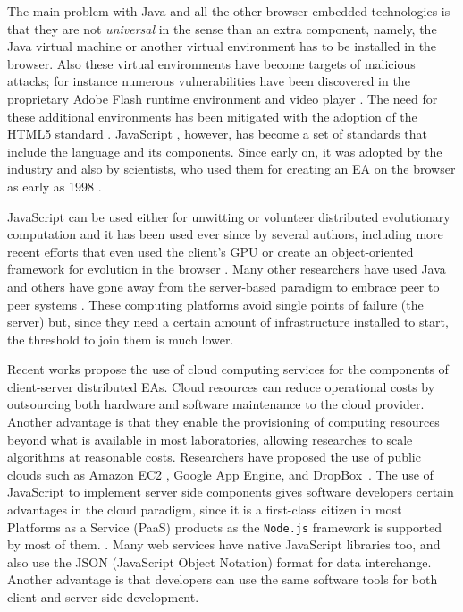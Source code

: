 \documentclass[journal,onecolumn]{IEEEtran}
\begin{document}
The main problem with Java and all the other browser-embedded
technologies is that they are not {\em universal} in the
sense than an extra component, namely, the Java virtual machine or another
virtual environment has to be installed in the browser.
Also these virtual environments have become targets of malicious attacks; 
for instance numerous vulnerabilities have been discovered in 
the proprietary Adobe Flash runtime environment and
video player \cite{ford2009analyzing,watanabe2010new}. The need for
these additional environments has been mitigated with the
adoption of the HTML5 standard \cite{anthes2012html5}.
JavaScript \cite{flanagan2006javascript}, however, has become a set of standards
\cite{ECMA-262} that include the language and its components. Since
early on, it was adopted by the industry and also by scientists,
who used them for creating an EA on
the browser as early as 1998 \cite{jj-ppsn98}.

JavaScript can be used either for unwitting
\cite{unwitting-ec} or volunteer 
\cite{langdon:2005:metas,gecco07:workshop:dcor} distributed
evolutionary computation and it has been used ever since by several
authors, including more recent efforts
\cite{Desell:2008:AHG:1389095.1389273,duda2013distributed,DBLP:journals/corr/abs-0801-1210} 
that even
used the client's GPU \cite{duda2013gpu} or create an object-oriented
framework for evolution in the browser \cite{EvoStar2014:jsEO}. Many other researchers have
used Java \cite{chong:1999:jDGPi} and others have gone away from the
server-based paradigm to embrace peer to peer systems
\cite{jin2006constructing,10.1109/ICICSE.2008.99,DBLP:conf/3pgcic/GuervosMFEL12}. These computing
platforms avoid single points of failure (the server) but, since they
need a certain amount of infrastructure installed to start, the
threshold to join them is much lower.

Recent works propose the use of cloud computing services for the components of
client-server distributed EAs. Cloud resources
can reduce operational costs by outsourcing both hardware and software maintenance
to the cloud provider. Another advantage is that they enable the provisioning of computing resources beyond what
is available in most laboratories, allowing researches to
scale algorithms at reasonable costs. Researchers have proposed the use of
public clouds such as Amazon EC2 \cite{CloudScale}, Google App Engine\cite{di2013towards},
and DropBox~\cite{mericloud}. The use of JavaScript to implement
server side components
gives software developers certain advantages in the cloud
paradigm, since it is a first-class citizen
in most Platforms as a Service (PaaS) products as the {\tt Node.js} framework is supported by most of them. \cite{wood13:nodejs:paas}. Many web services
have native JavaScript libraries too, and also use the JSON (JavaScript Object Notation) format for data interchange. Another advantage is that
developers can use the same software tools for both client and server
side development.
\end{document}
